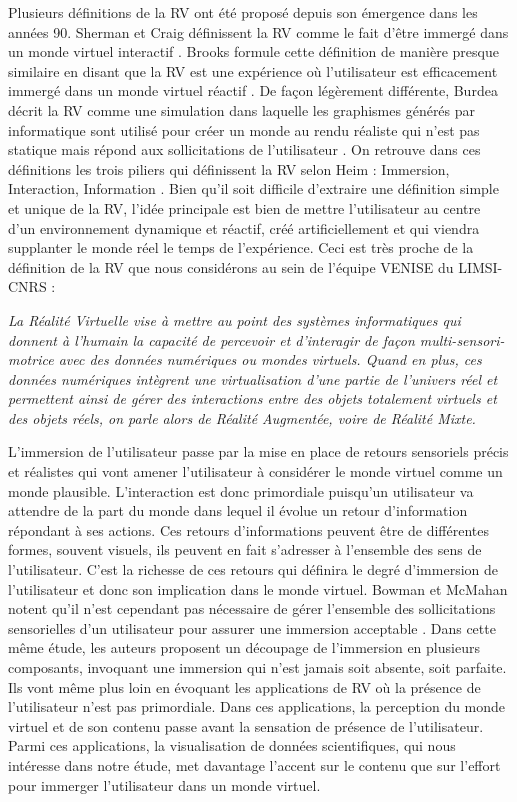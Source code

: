 Plusieurs définitions de la RV ont été proposé depuis son émergence dans les années 90. Sherman et Craig définissent la RV comme le fait d'être immergé dans un monde virtuel interactif \cite{sherman2002understanding}. Brooks formule cette définition de manière presque similaire en disant que la RV est une expérience où l'utilisateur est efficacement immergé dans un monde virtuel réactif \cite{brooks1999s}. De façon légèrement différente, Burdea décrit la RV comme une simulation dans laquelle les graphismes générés par informatique sont utilisé pour créer un monde au rendu réaliste qui n'est pas statique mais répond aux sollicitations de l'utilisateur \cite{burdea2003virtual}. On retrouve dans ces définitions les trois piliers qui définissent la RV selon Heim : Immersion, Interaction, Information \cite{heim1998virtual}. Bien qu'il soit difficile d'extraire une définition simple et unique de la RV, l'idée principale est bien de mettre l'utilisateur au centre d'un environnement dynamique et réactif, créé artificiellement et qui viendra supplanter le monde réel le temps de l'expérience. Ceci est très proche de la définition de la RV que nous considérons au sein de l'équipe VENISE du LIMSI-CNRS \cite{bourdot_patrick_reconstruction_2002}:

\textit{La Réalité Virtuelle vise à mettre au point des systèmes informatiques qui donnent à l'humain la capacité de percevoir et d’interagir de façon multi-sensori-motrice avec des données numériques ou mondes virtuels. Quand en plus, ces données numériques intègrent une virtualisation d’une partie de l’univers réel et permettent ainsi de gérer des interactions entre des objets totalement virtuels et des objets réels, on parle alors de Réalité Augmentée, voire de Réalité Mixte.
}

L'immersion de l'utilisateur passe par la mise en place de retours sensoriels précis et réalistes qui vont amener l'utilisateur à considérer le monde virtuel comme un monde plausible. L'interaction est donc primordiale puisqu'un utilisateur va attendre de la part du monde dans lequel il évolue un retour d'information répondant à ses actions. Ces retours d'informations peuvent être de différentes formes, souvent visuels, ils peuvent en fait s'adresser à l'ensemble des sens de l'utilisateur. C'est la richesse de ces retours qui définira le degré d'immersion de l'utilisateur et donc son implication dans le monde virtuel. Bowman et McMahan notent qu'il n'est cependant pas nécessaire de gérer l'ensemble des sollicitations sensorielles d'un utilisateur pour assurer une immersion acceptable \cite{bowman_virtual_2007}. Dans cette même étude, les auteurs proposent un découpage de l'immersion en plusieurs composants, invoquant une immersion qui n'est jamais soit absente, soit parfaite. Ils vont même plus loin en évoquant les applications de RV où la présence de l'utilisateur n'est pas primordiale. Dans ces applications, la perception du monde virtuel et de son contenu passe avant la sensation de présence de l'utilisateur. Parmi ces applications, la visualisation de données scientifiques, qui nous intéresse dans notre étude, met davantage l'accent sur le contenu que sur l'effort pour immerger l'utilisateur dans un monde virtuel.

